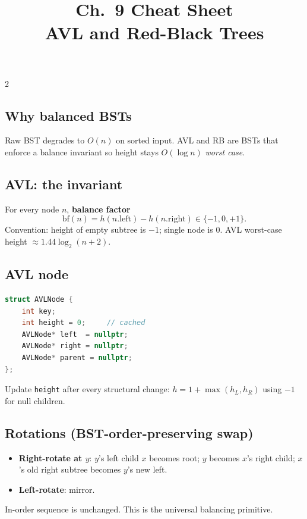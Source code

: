 \documentclass[10pt]{article}
\title{Ch.~9 Cheat Sheet\\\large AVL and Red-Black Trees}
\author{}
\date{}
\begin{document}
\maketitle
\vspace{-2em}

\begin{multicols}{2}

\subsection*{Why balanced BSTs}
Raw BST degrades to $O(n)$ on sorted input. AVL and RB are
BSTs that enforce a balance invariant so height stays
$O(\log n)$ \emph{worst case}.

\subsection*{AVL: the invariant}
For every node $n$, \textbf{balance factor}
\[
\mathrm{bf}(n) = h(n.\mathrm{left}) - h(n.\mathrm{right}) \in \{-1, 0, +1\}.
\]
Convention: height of empty subtree is $-1$; single node is $0$.
AVL worst-case height $\approx 1.44 \log_2(n+2)$.

\subsection*{AVL node}
\begin{lstlisting}[language=C++]
struct AVLNode {
    int key;
    int height = 0;     // cached
    AVLNode* left  = nullptr;
    AVLNode* right = nullptr;
    AVLNode* parent = nullptr;
};
\end{lstlisting}
Update \texttt{height} after every structural change:
$h = 1 + \max(h_L, h_R)$ using $-1$ for null children.

\subsection*{Rotations (BST-order-preserving swap)}
\begin{itemize}
    \item \textbf{Right-rotate at $y$}: $y$'s left child $x$ becomes
    root; $y$ becomes $x$'s right child; $x$'s old right subtree
    becomes $y$'s new left.
    \item \textbf{Left-rotate}: mirror.
\end{itemize}
In-order sequence is unchanged. This is the universal balancing
primitive.


\end{multicols}
\end{document}
